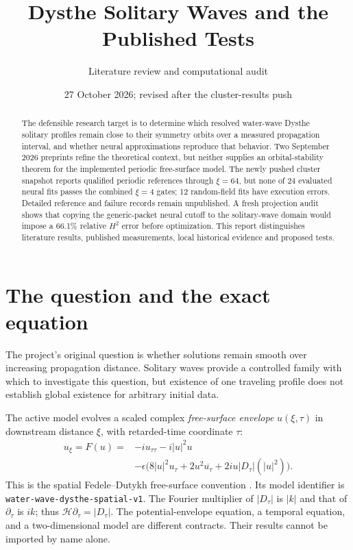 \documentclass[11pt]{article}
\title{Dysthe Solitary Waves and the Published Tests}
\author{Literature review and computational audit}
\date{27 October 2026; revised after the cluster-results push}
\newcommand{\absD}{\lvert D_\tau\rvert}
\newcommand{\model}{\texttt{water-\allowbreak wave-\allowbreak dysthe-\allowbreak spatial-v1}}
\begin{document}
\maketitle
\begin{abstract}
The defensible research target is to determine which resolved water-wave
Dysthe solitary profiles remain close to their symmetry orbits over a measured
propagation interval, and whether neural approximations reproduce that behavior.
Two September 2026 preprints refine the theoretical context, but neither supplies
an orbital-stability theorem for the implemented periodic free-surface model.
The newly pushed cluster snapshot reports qualified periodic references through
$\xi=64$, but none of 24 evaluated neural fits passes the combined $\xi=4$ gates;
12 random-field fits have execution errors. Detailed reference and failure
records remain unpublished. A fresh projection audit shows that copying the generic-packet neural
cutoff to the solitary-wave domain would impose a 66.1\% relative $H^2$ error
before optimization. This report distinguishes literature results, published
measurements, local historical evidence and proposed tests.
\end{abstract}

\section{The question and the exact equation}
The project's original question is whether solutions remain smooth over
increasing propagation distance. Solitary waves provide a controlled family
with which to investigate this question, but existence of one traveling profile
does not establish global existence for arbitrary initial data.

The active model evolves a scaled complex \emph{free-surface envelope}
$u(\xi,\tau)$ in downstream distance $\xi$, with retarded-time coordinate $\tau$:
\begin{equation}\label{eq:dysthe}
\begin{aligned}
u_\xi=F(u)={}&-iu_{\tau\tau}-i|u|^2u\\
&-\epsilon\bigl(8|u|^2u_\tau+2u^2\overline{u_\tau}
               +2iu\absD(|u|^2)\bigr).
\end{aligned}
\end{equation}
This is the spatial Fedele--Dutykh free-surface convention \cite{fd}.
Its model identifier is \model. The Fourier multiplier of $\absD$ is $|k|$ and that of
$\partial_\tau$ is $ik$; thus $\mathcal H\partial_\tau=\absD$.
The potential-envelope equation, a temporal equation, and a two-dimensional
model are different contracts. Their results cannot be imported by name alone.
\end{document}
